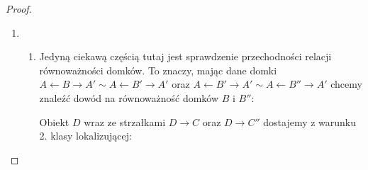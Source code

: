 \begin{proof}
  \begin{enumerate}
    \item 
      \begin{enumerate}
        \item Jedyną ciekawą częścią tutaj jest sprawdzenie przechodności relacji równoważności domków. To znaczy, mając dane domki $A\leftarrow B\to A'\sim A\leftarrow B'\to A'$ oraz $A\leftarrow B'\to A'\sim A\leftarrow B''\to A'$ chcemy znaleźć dowód na równoważność domków $B$ i $B''$:
          \begin{center}\end{center}
          Obiekt $D$ wraz ze strzałkami $D\to C$ oraz $D\to C''$ dostajemy z warunku 2. klasy lokalizującej:
          \begin{center}\end{center}


\end{enumerate}
\end{enumerate}
\end{proof}
